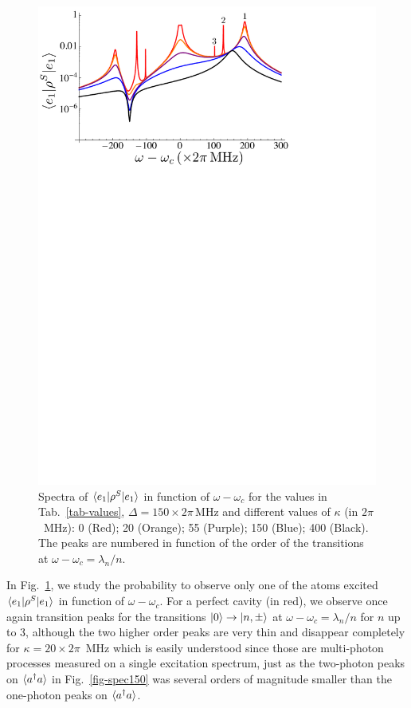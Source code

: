 \begin{figure}
\center
\includegraphics[width=0.75 \textwidth]{Images/chap5/eg_kappa.pdf}
\caption[$\prodsc{e_1}{\rho^S}{e_1}$ in function of $\omega-\omega_c$]{ Spectra of $\prodsc{e_1}{\rho^S}{e_1}$ in function of $\omega-\omega_c$ for the values in Tab.~\ref{tab-values}, $\Delta=150 \times 2\pi\,\mbox{MHz}$ and different values of $\kappa$ (in $2\pi$~MHz): 0 (Red); 20 (Orange); 55 (Purple); 150 (Blue); 400 (Black). The peaks are numbered in function of the order of the transitions at $\omega-\omega_c=\lambda_n/n$. }
\label{fig-eg_kappa}
\end{figure}


In Fig.~\ref{fig-eg_kappa}, we study the probability to observe only one of the atoms excited $\prodsc{e_1}{\rho^S}{e_1}$ in function of $\omega-\omega_c$. For a perfect cavity (in red), we observe once again transition peaks for the transitions $| 0 \rangle \rightarrow | n,\pm \rangle$ at $\omega-\omega_c=\lambda_n/n$ for $n$ up to 3, although the two higher order peaks are very thin and disappear completely for $\kappa=20\times 2\pi$~MHz which is easily understood since those are multi-photon processes measured on a single excitation spectrum, just as the two-photon peaks on $\langle a^\dagger a \rangle$ in Fig.~\ref{fig-spec150} was several orders of magnitude smaller than the one-photon peaks on $\langle a^\dagger a \rangle$. 

